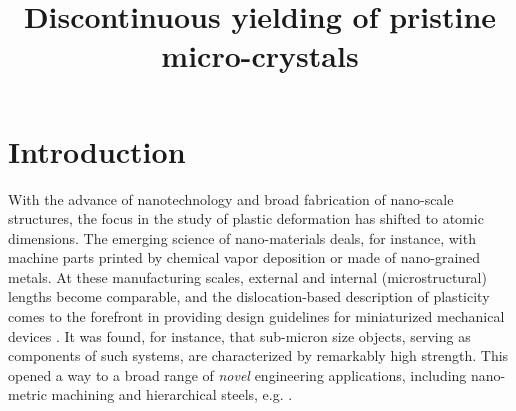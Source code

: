 \documentclass[CRPHYS,Unicode,manuscript]{cedram}
\title{Discontinuous yielding of pristine micro-crystals}
\author[\firstname{O.U.} \lastname{Salman}\IsCorresp]{\firstname{O.} \middlename{U.}
  \lastname{Salman}\IsCorresp}
\author[\firstname{R.} \lastname{Baggio}]{\firstname{R.} \lastname{Baggio}}
\author[\firstname{B.} \lastname{Bacroix}]{\firstname{B.} \lastname{Bacroix}}
\author[\firstname{G.} \lastname{Zanzotto}]{\firstname{G.}  \lastname{Zanzotto}}
\author[\firstname{N.} \lastname{Gorbushin}]{\firstname{N.} \lastname{Gorbushin}}
\author[\firstname{L.}  \lastname{Truskinovsky}]{\firstname{L.} \lastname{Truskinovsky}\IsCorresp}
\begin{document}
\maketitle


\section{Introduction}

With the advance of nanotechnology and broad fabrication of nano-scale structures, the focus in the study of plastic deformation has shifted to atomic dimensions.  The emerging  science of nano-materials  deals, for instance,   with machine parts printed by chemical vapor deposition or made of  nano-grained metals.  At these manufacturing  scales, external and internal (microstructural) lengths become comparable, and the  dislocation-based description of plasticity comes to the forefront in providing design guidelines for  miniaturized mechanical devices \cite{Lee2009-as,Li2016-cz,Lu2016-ag}.  It was found, for instance,  that sub-micron size objects, serving as components of such systems, are characterized by remarkably high strength. This opened  a way  to a broad range of \emph{novel} engineering applications, including nano-metric machining and hierarchical steels, e.g. \cite{Schaedler2011-gn}. 
\end{document}
